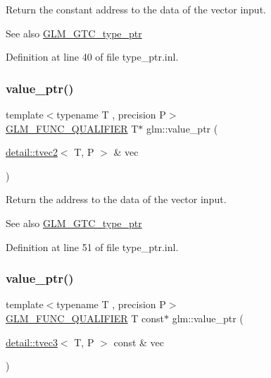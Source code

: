 Return the constant address to the data of the vector input. \begin{DoxySeeAlso}{See also}
\hyperlink{group__gtc__type__ptr}{G\+L\+M\+\_\+\+G\+T\+C\+\_\+type\+\_\+ptr} 
\end{DoxySeeAlso}


Definition at line 40 of file type\+\_\+ptr.\+inl.

\mbox{\label{group__gtc__type__ptr_gac2a64387090621acf7176b63f31b70a2}} 
\subsubsection{\texorpdfstring{value\+\_\+ptr()}{value\_ptr()}\hspace{0.1cm}{\footnotesize\ttfamily [2/27]}}
{\footnotesize\ttfamily template$<$typename T , precision P$>$ \\
\hyperlink{setup_8hpp_a33fdea6f91c5f834105f7415e2a64407}{G\+L\+M\+\_\+\+F\+U\+N\+C\+\_\+\+Q\+U\+A\+L\+I\+F\+I\+ER} T$\ast$ glm\+::value\+\_\+ptr (\begin{DoxyParamCaption}\item[{\hyperlink{structglm_1_1detail_1_1tvec2}{detail\+::tvec2}$<$ T, P $>$ \&}]{vec }\end{DoxyParamCaption})}

Return the address to the data of the vector input. \begin{DoxySeeAlso}{See also}
\hyperlink{group__gtc__type__ptr}{G\+L\+M\+\_\+\+G\+T\+C\+\_\+type\+\_\+ptr} 
\end{DoxySeeAlso}


Definition at line 51 of file type\+\_\+ptr.\+inl.

\mbox{\label{group__gtc__type__ptr_ga676a0ba6f4b7cd817fe6d16cb3113857}} 
\subsubsection{\texorpdfstring{value\+\_\+ptr()}{value\_ptr()}\hspace{0.1cm}{\footnotesize\ttfamily [3/27]}}
{\footnotesize\ttfamily template$<$typename T , precision P$>$ \\
\hyperlink{setup_8hpp_a33fdea6f91c5f834105f7415e2a64407}{G\+L\+M\+\_\+\+F\+U\+N\+C\+\_\+\+Q\+U\+A\+L\+I\+F\+I\+ER} T const$\ast$ glm\+::value\+\_\+ptr (\begin{DoxyParamCaption}\item[{\hyperlink{structglm_1_1detail_1_1tvec3}{detail\+::tvec3}$<$ T, P $>$ const \&}]{vec }\end{DoxyParamCaption})}

